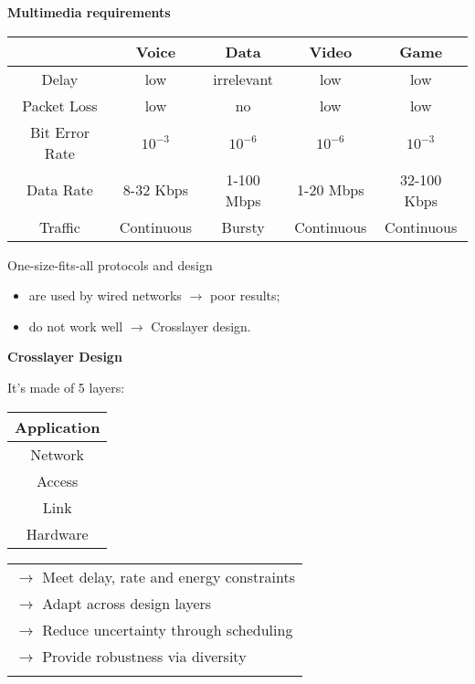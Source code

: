 \textbf{Multimedia requirements}
\vspace*{\fill}
\begin{center}
    \begin{tabular}{|c|c|c|c|c|}
        \hline
        & Voice & Data & Video & Game \\
        \hline
        Delay & low & irrelevant & low & low \\
        \hline
        Packet Loss & low & no & low & low \\
        \hline
        Bit Error Rate & $10^{-3}$ & $10^{-6}$ & $10^{-6}$ & $10^{-3}$ \\
        \hline
        Data Rate & 8-32 Kbps & 1-100 Mbps & 1-20 Mbps & 32-100 Kbps \\
        \hline
        Traffic & Continuous & Bursty & Continuous & Continuous \\
        \hline
    \end{tabular}
\end{center}
\vspace*{\fill}
\vspace*{\fill}
One-size-fits-all protocols and design
\begin{itemize}
    \item are used by wired networks $\rightarrow$ poor results;
    \item do not work well $\rightarrow$ Crosslayer design.
\end{itemize} 
\vspace*{\fill}
\newpage
\textbf{Crosslayer Design}

It's made of 5 layers:

\begin{minipage}{.2 \linewidth}
    \begin{tabular}{|c|}
        \hline
        Application\\
        \hline
        Network\\
        \hline
        Access\\
        \hline
        Link\\
        \hline
        Hardware\\
        \hline
    \end{tabular}
\end{minipage}
\begin{minipage}{.2 \linewidth}
    \begin{tabular}{l}
        $\rightarrow$ Meet delay, rate and energy constraints\\
        $\rightarrow$ Adapt across design layers\\
        $\rightarrow$ Reduce uncertainty through scheduling\\
        $\rightarrow$ Provide robustness via diversity\\
        \\
    \end{tabular}
\end{minipage}

